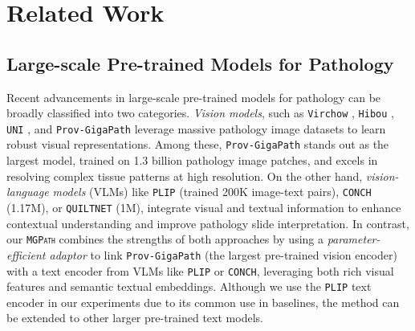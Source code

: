 \section{Related Work}
\label{section:related_work}

\subsection{Large-scale Pre-trained Models for Pathology}
Recent advancements in large-scale pre-trained models for pathology can be broadly classified into two categories. \textit{Vision models}, such as 
\texttt{Virchow} \cite{ikezogwo2024quilt}, 
\texttt{Hibou} \cite{nechaev2024hibou}, \texttt{UNI} \cite{chen2024towards}, and \texttt{Prov-GigaPath} \cite{xu2024whole} leverage massive pathology image datasets to learn robust visual representations. Among these, \texttt{Prov-GigaPath} stands out as the largest model, trained on 1.3 billion pathology image patches, and excels in resolving complex tissue patterns at high resolution. On the other hand, \textit{vision-language models} (VLMs) like \texttt{PLIP} \cite{huang2023visual} (trained 200K image-text pairs), \texttt{CONCH} \cite{lu2024visual} (1.17M), or \texttt{QUILTNET}\cite{ikezogwo2024quilt} (1M), integrate visual and textual information to enhance contextual understanding and improve pathology slide interpretation. In contrast,  our \texttt{\textsc{MGPath}} combines the strengths of both approaches by using a \textit{parameter-efficient adaptor} to link \texttt{Prov-GigaPath} (the largest pre-trained vision encoder) with a text encoder from VLMs like \texttt{PLIP} or \texttt{CONCH}, leveraging both rich visual features and semantic textual embeddings. Although we use the \texttt{PLIP} text encoder in our experiments due to its common use in baselines, the method can be extended to other larger pre-trained text models.



